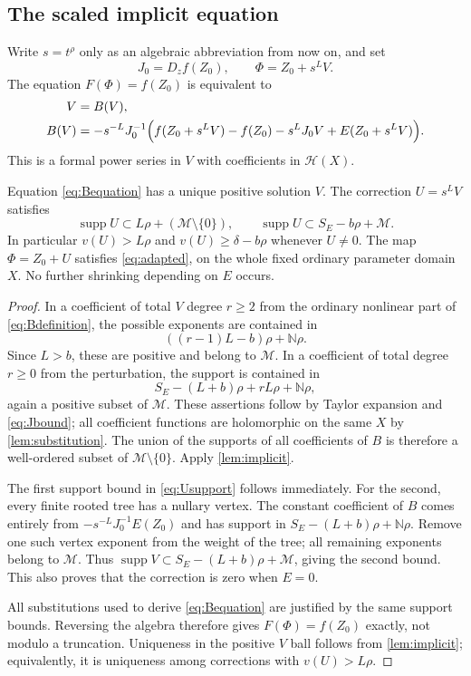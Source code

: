 \documentclass[11pt,letterpaper]{article}
\theoremstyle{definition}
\theoremstyle{remark}
\newcommand{\N}{\mathbb N}\newcommand{\Z}{\mathbb Z}\newcommand{\Q}{\mathbb Q}
\newcommand{\HH}{\mathscr H}\newcommand{\FF}{\mathscr F}
\newcommand{\supp}{\operatorname{supp}}\newcommand{\CT}{\operatorname{CT}}
\numberwithin{equation}{section}
\begin{document}
\subsection{The scaled implicit equation}
Write $s=t^\rho$ only as an algebraic abbreviation from now on, and set
\[
 J_0=D_zf(Z_0),\qquad \Phi=Z_0+s^L V.
\]
The equation $F(\Phi)=f(Z_0)$ is equivalent to
\begin{align}
 V&=B(V),\label{eq:Bequation}\\
 B(V)&=-s^{-L}J_0^{-1}\Bigl(
 f(Z_0+s^LV)-f(Z_0)-s^LJ_0V+E(Z_0+s^LV)\Bigr).
 \label{eq:Bdefinition}
\end{align}
This is a formal power series in $V$ with coefficients in $\HH(X)$.

\begin{proposition}\label{prop:lift}
Equation \eqref{eq:Bequation} has a unique positive solution $V$. The
correction $U=s^LV$ satisfies
\begin{equation}\label{eq:Usupport}
 \supp U\subset L\rho+(\mathcal M\setminus\{0\}),\qquad
 \supp U\subset S_E-b\rho+\mathcal M.
\end{equation}
In particular $v(U)>L\rho$ and $v(U)\geq\delta-b\rho$ whenever $U\ne0$.
The map $\Phi=Z_0+U$ satisfies \eqref{eq:adapted}, on the whole fixed
ordinary parameter domain $X$. No further shrinking depending on $E$ occurs.
\end{proposition}
\begin{proof}
In a coefficient of total $V$ degree $r\geq2$ from the ordinary nonlinear
part of \eqref{eq:Bdefinition}, the possible exponents are contained in
\[
 ((r-1)L-b)\rho+\N\rho.
\]
Since $L>b$, these are positive and belong to $\mathcal M$. In a coefficient
of total degree $r\geq0$ from the perturbation, the support is contained in
\[
 S_E-(L+b)\rho+rL\rho+\N\rho,
\]
again a positive subset of $\mathcal M$. These assertions follow by Taylor
expansion and \eqref{eq:Jbound}; all coefficient functions are holomorphic
on the same $X$ by \cref{lem:substitution}. The union of the supports of all
coefficients of $B$ is therefore a well-ordered subset of
$\mathcal M\setminus\{0\}$. Apply \cref{lem:implicit}.

The first support bound in \eqref{eq:Usupport} follows immediately. For the
second, every finite rooted tree has a nullary vertex. The constant coefficient
of $B$ comes entirely from $-s^{-L}J_0^{-1}E(Z_0)$ and has support in
$S_E-(L+b)\rho+\N\rho$. Remove one such vertex exponent from the weight
of the tree; all remaining exponents belong to $\mathcal M$. Thus
$\supp V\subset S_E-(L+b)\rho+\mathcal M$, giving the second bound.
This also proves that the correction is zero when $E=0$.

All substitutions used to derive \eqref{eq:Bequation} are justified by the
same support bounds. Reversing the algebra therefore gives $F(\Phi)=f(Z_0)$
exactly, not modulo a truncation. Uniqueness in the positive $V$ ball follows
from \cref{lem:implicit}; equivalently, it is uniqueness among corrections
with $v(U)>L\rho$.
\end{proof}
\end{document}
